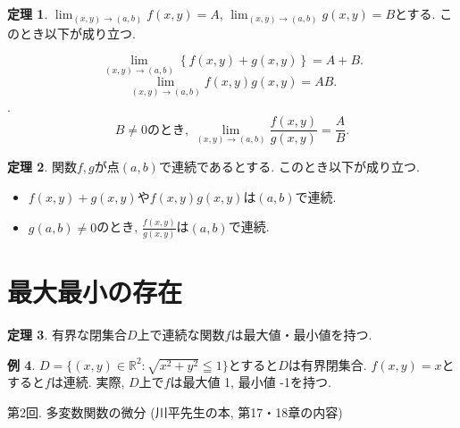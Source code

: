 \documentclass[dvipdfmx,a4paper,11pt]{article}
\newcommand{\R}{\mathbb{R}}
\theoremstyle{definition}
\newtheorem{thm}{定理}
\newtheorem{exa}[thm]{例}
\begin{document}
\begin{tcolorbox}[
    colback = white,
    colframe = green!35!black,
    fonttitle = \bfseries,
    breakable = true]
    \begin{thm}
     $\lim_{(x,y) \rightarrow (a,b)} f(x,y) =A$, $ \lim_{(x,y) \rightarrow (a,b)} g(x,y) =B$とする. このとき以下が成り立つ.
     
 $$  \lim_{(x,y) \rightarrow (a,b)} \left\{ f(x,y) + g(x,y)\right\} =A+B.$$
  $$  \lim_{(x,y) \rightarrow (a,b)} f(x,y) g(x,y) =AB.$$.
   $$\text{$B \neq 0$のとき, }  \lim_{(x,y) \rightarrow (a,b)} \frac{f(x,y) }{ g(x,y)} =\frac{A}{B}.$$
    \end{thm}
\end{tcolorbox}
\begin{tcolorbox}[
    colback = white,
    colframe = green!35!black,
    fonttitle = \bfseries,
    breakable = true]
    \begin{thm}
    \label{continess}
    関数$f,g$が点$(a,b)$で連続であるとする. このとき以下が成り立つ.
    \begin{itemize}
    \item $f(x,y) + g(x,y)$や$f(x,y)g(x,y)$は$(a,b)$で連続.
    \item $g(a,b) \neq 0$のとき, $\frac{f(x,y) }{ g(x,y)} $は$(a,b)$で連続.
    \end{itemize}

    \end{thm}
\end{tcolorbox}



\section{最大最小の存在}
\begin{tcolorbox}[
    colback = white,
    colframe = green!35!black,
    fonttitle = \bfseries,
    breakable = true]
    \begin{thm}
    有界な閉集合$D$上で連続な関数$f$は最大値・最小値を持つ.
    \end{thm}
\end{tcolorbox}

\begin{exa}
$D = \{ (x,y) \in \R^2 : \sqrt{x^2 + y^2} \leqq 1  \}$とすると$D$は有界閉集合.
$f(x,y) =x$とすると$f$は連続. 
実際, $D$上で$f$は最大値 1, 最小値 -1を持つ.
\end{exa}

\newpage

\begin{center}
{\Large 第2回. 多変数関数の微分 (川平先生の本, 第17・18章の内容)}
\end{center}
\end{document}
